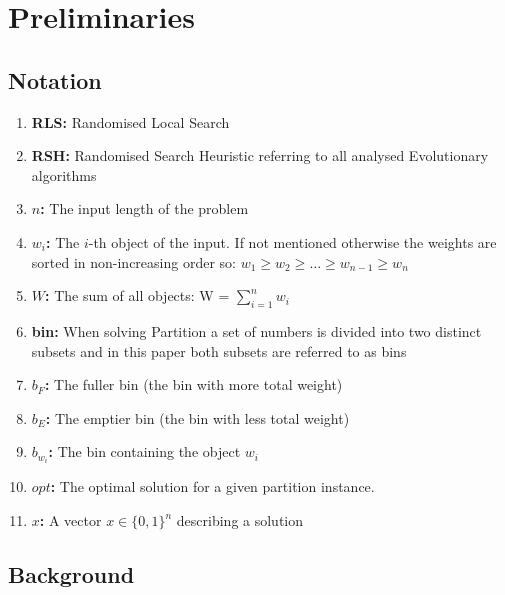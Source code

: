 
\chapter{Preliminaries}\label{ch:preliminaries}

\section{Notation}
\begin{enumerate}
    \item \textbf{RLS:} Randomised Local Search
    \item \textbf{RSH:} Randomised Search Heuristic referring to all analysed Evolutionary algorithms
    \item \textbf{$n$:} The input length of the problem
    \item \textbf{$w_i$:} The $i$-th object of the input. If not mentioned otherwise the weights are sorted in non-increasing order so: \(w_1 \ge w_2 \ge \ldots \ge w_{n-1} \ge w_{n}\)
    \item \textbf{$W$:} The sum of all objects: W = $\sum_{i=1}^{n}w_i$
    \item \textbf{bin:} When solving Partition a set of numbers is divided into two distinct subsets and in this paper both subsets are referred to as bins
    \item \textbf{$b_F$:} The fuller bin (the bin with more total weight)
    \item \textbf{$b_E$:} The emptier bin (the bin with less total weight)
    \item \textbf{$b_{w_i}$:} The bin containing the object $w_i$
    \item \textbf{$opt$:} The optimal solution for a given partition instance.
    \item \textbf{$x$:} A vector $x \in {\{0, 1\}}^n$ describing a solution
\end{enumerate}

\section{Background}
